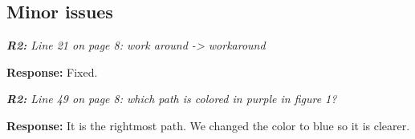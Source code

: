 \documentclass{article}
\begin{document}
\subsection{Minor issues}

\textit{\textbf{R2:} Line 21 on page 8: work around -> workaround}

\vspace*{1em} \noindent \textbf{Response:} Fixed.

\vspace*{1em} \noindent \textit{\textbf{R2:} Line 49 on page 8: which path is colored in purple in figure 1?}

\vspace*{1em} \noindent \textbf{Response:} It is the rightmost path. We changed the color to blue so it is clearer.

\small


\end{document}
